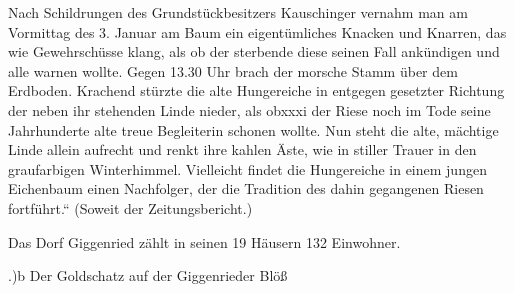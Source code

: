 \documentclass{book}
\begin{document}
Nach Schildrungen des Grundstückbesitzers Kauschinger vernahm man am Vormittag
des 3. Januar am Baum ein eigentümliches Knacken und Knarren, das wie
Gewehrschüsse klang, als ob der sterbende diese seinen Fall ankündigen und alle
warnen wollte. Gegen 13.30 Uhr brach der morsche Stamm über dem Erdboden.
Krachend stürzte die alte Hungereiche in entgegen gesetzter Richtung der neben
ihr stehenden Linde nieder, als obxxxi der Riese noch im Tode seine Jahrhunderte
alte treue Begleiterin schonen wollte. Nun steht die alte, mächtige Linde allein
aufrecht und renkt ihre kahlen Äste, wie in stiller Trauer in den graufarbigen
Winterhimmel. Vielleicht findet die Hungereiche in einem jungen Eichenbaum einen
Nachfolger, der die Tradition des dahin gegangenen Riesen fortführt.“ (Soweit
der Zeitungsbericht.)

Das Dorf Giggenried zählt in seinen 19 Häusern 132 Einwohner.

.)b Der Goldschatz auf der Giggenrieder Blöß
\end{document}
